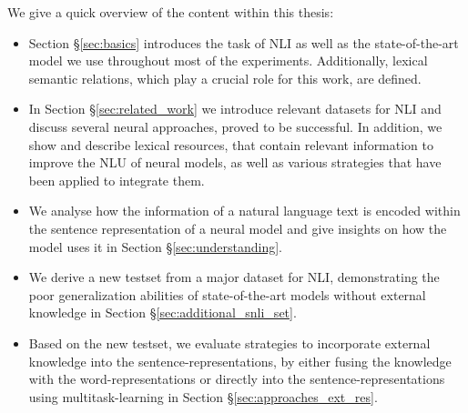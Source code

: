\noindent
We give a quick overview of the content within this thesis:
\begin{itemize}
\item Section §\ref{sec:basics} introduces the task of \ac{NLI} as well as the state-of-the-art model we use throughout most of the experiments. Additionally, lexical semantic relations, which play a crucial role for this work, are defined.
\item In Section §\ref{sec:related_work} we introduce relevant datasets for \ac{NLI} and discuss several neural approaches, proved to be successful. In addition, we show and describe lexical resources, that contain relevant information to improve the \ac{NLU} of neural models, as well as various strategies that have been applied to integrate them.
\item We analyse how the information of a natural language text is encoded within the sentence representation of a neural model and give insights on how the model uses it in Section §\ref{sec:understanding}.
\item We derive a new testset from a major dataset for \ac{NLI}, demonstrating the poor generalization abilities of state-of-the-art models without external knowledge in Section §\ref{sec:additional_snli_set}.
\item Based on the new testset, we evaluate strategies to incorporate external knowledge into the sentence-representations, by either fusing the knowledge with the word-representations or directly into the sentence-representations using multitask-learning in Section §\ref{sec:approaches_ext_res}.
\end{itemize}